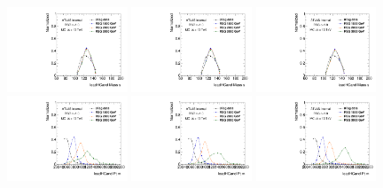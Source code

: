 \begin{figure}[htbp!]
\begin{center}
\includegraphics[width=0.32\textwidth,angle=-90]{figures/boosted/Truth/Moriond_comp_0_FourTag_Signal_leadHCand_Mass_s.pdf}
\includegraphics[width=0.32\textwidth,angle=-90]{figures/boosted/Truth/Moriond_comp_0_ThreeTag_Signal_leadHCand_Mass_s.pdf}
\includegraphics[width=0.32\textwidth,angle=-90]{figures/boosted/Truth/Moriond_comp_0_TwoTag_split_Signal_leadHCand_Mass_s.pdf}\\
\includegraphics[width=0.32\textwidth,angle=-90]{figures/boosted/Truth/Moriond_comp_0_FourTag_Signal_leadHCand_Pt_m.pdf}
\includegraphics[width=0.32\textwidth,angle=-90]{figures/boosted/Truth/Moriond_comp_0_ThreeTag_Signal_leadHCand_Pt_m.pdf}
\includegraphics[width=0.32\textwidth,angle=-90]{figures/boosted/Truth/Moriond_comp_0_TwoTag_split_Signal_leadHCand_Pt_m.pdf}\\

\end{center}
\end{figure}
